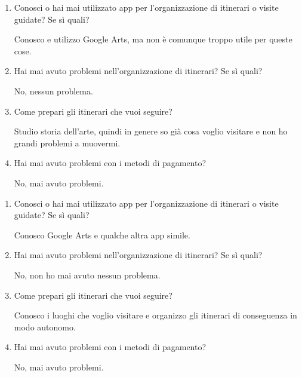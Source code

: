 \clearpage
{}

\begin{enumerate}

\item Conosci o hai mai utilizzato app per l'organizzazione di itinerari o visite guidate? Se sì quali?

Conosco e utilizzo Google Arts, ma non è comunque troppo utile per queste cose.

\item Hai mai avuto problemi nell'organizzazione di itinerari? Se sì quali?

No, nessun problema.

\item Come prepari gli itinerari che vuoi seguire?

Studio storia dell'arte, quindi in genere so già cosa voglio visitare e non ho grandi problemi a muovermi.

\item Hai mai avuto problemi con i metodi di pagamento?

No, mai avuto problemi.

\end{enumerate}

\clearpage
{}

\begin{enumerate}

\item Conosci o hai mai utilizzato app per l'organizzazione di itinerari o visite guidate? Se sì quali?

Conosco Google Arts e qualche altra app simile.

\item Hai mai avuto problemi nell'organizzazione di itinerari? Se sì quali?

No, non ho mai avuto nessun problema.

\item Come prepari gli itinerari che vuoi seguire?

Conosco i luoghi che voglio visitare e organizzo gli itinerari di conseguenza in modo autonomo.

\item Hai mai avuto problemi con i metodi di pagamento?

No, mai avuto problemi.

\end{enumerate}

\clearpage
{}

